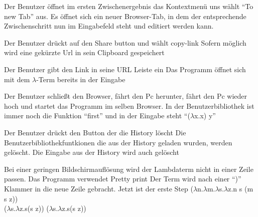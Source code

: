 \documentclass[parskip=full,11pt,twoside]{scrartcl}
\begin{document}
{Der Benutzer öffnet im ersten Zwischenergebnis das Kontextmenü uns wählt \enquote{To new Tab} aus.}
{Es öffnet sich ein neuer Browser-Tab, in dem der entsprechende Zwischenschritt nun im Eingabefeld steht und editiert werden kann.}

{ Der Benutzer drückt auf den Share button und wählt copy-link}
{ Sofern möglich wird eine gekürzte Url in sein Clipboard gespeichert }

{Der Benutzer gibt den Link in seine URL Leiste ein }
{ Das Programm öffnet sich mit dem $\lambda$-Term bereits in der Eingabe }

{Der Benutzer schließt den Browser, fährt den Pc herunter, fährt den Pc wieder hoch und startet das Programm im selben Browser.}
{In der Benutzerbibliothek ist immer noch die Funktion \enquote{first} und in der Eingabe steht \enquote{($\lambda$x.x) y}}

{Der Benutzer drückt den Button der die History löscht}
{Die Benutzerbibliothekfuntkionen die aus der History geladen wurden, werden gelöscht. Die Eingabe aus der History wird auch gelöscht}


{Bei einer geringen Bildschirmauflösung wird der Lambdaterm nicht in einer Zeile passen. Das Programm verwendet Pretty print }
{Der Term wird nach einer \enquote{)} Klammer in die neue Zeile gebracht. Jetzt ist der erste Step \newline ($\lambda$n.$\lambda$m.$\lambda$s.$\lambda$z.n s (m s z)) 
\\
\noindent\hspace*{5mm}
 ($\lambda$s.$\lambda$z.s(s z)) ($\lambda$s.$\lambda$z.s(s z)) }
\end{document}
